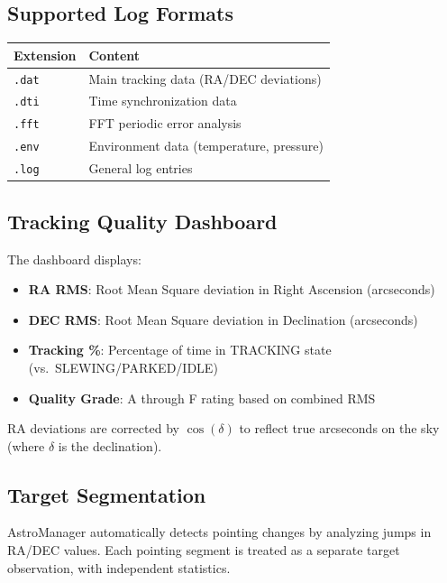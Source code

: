 \documentclass[11pt,a4paper]{article}
\begin{document}
\subsection{Supported Log Formats}

\begin{center}
\begin{tabular}{ll}
\toprule
\textbf{Extension} & \textbf{Content} \\
\midrule
\texttt{.dat} & Main tracking data (RA/DEC deviations) \\
\texttt{.dti} & Time synchronization data \\
\texttt{.fft} & FFT periodic error analysis \\
\texttt{.env} & Environment data (temperature, pressure) \\
\texttt{.log} & General log entries \\
\bottomrule
\end{tabular}
\end{center}

\subsection{Tracking Quality Dashboard}

The dashboard displays:
\begin{itemize}
    \item \textbf{RA RMS}: Root Mean Square deviation in Right Ascension (arcseconds)
    \item \textbf{DEC RMS}: Root Mean Square deviation in Declination (arcseconds)
    \item \textbf{Tracking \%}: Percentage of time in TRACKING state (vs.\ SLEWING/PARKED/IDLE)
    \item \textbf{Quality Grade}: A through F rating based on combined RMS
\end{itemize}

RA deviations are corrected by $\cos(\delta)$ to reflect true arcseconds on the sky (where $\delta$ is the declination).

\subsection{Target Segmentation}

AstroManager automatically detects pointing changes by analyzing jumps in RA/DEC values. Each pointing segment is treated as a separate target observation, with independent statistics.
\end{document}
